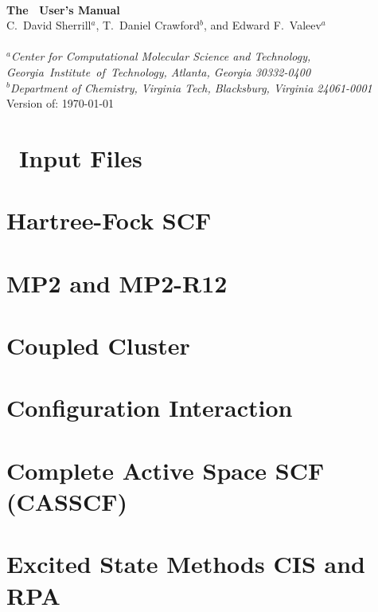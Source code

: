 \documentclass[12pt]{article}
\begin{document}


\begin{center}
\ \\
\vspace{2.0in}
{\bf {\Large The \PSIthree\ User's Manual}} \\
\vspace{0.5in}
C.~David Sherrill$^a$, T.~Daniel Crawford$^b$, and Edward F.~Valeev$^a$\\
\ \\
{\em $^a$Center for Computational Molecular Science and Technology, 
  \mbox{Georgia Institute of Technology,} Atlanta, Georgia 30332-0400} \\
\vspace{0.1in}
{\em $^b$Department of Chemistry, Virginia Tech, Blacksburg, Virginia 
  24061-0001}
\ \\
\vspace{0.3in}
Version of: \today
\end{center}

\thispagestyle{empty}

\newpage
\newpage




\section{\PSIthree\ Input Files} \label{input}


\section{Hartree-Fock SCF}
\section{MP2 and MP2-R12}
\section{Coupled Cluster}

\section{Configuration Interaction}
\section{Complete Active Space SCF (CASSCF)}
\section{Excited State Methods CIS and RPA}
\end{document}
